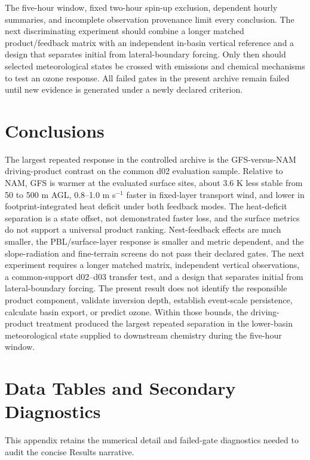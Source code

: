 \documentclass[air,article,submit,moreauthors]{Definitions/mdpi}
\begin{document}
The five-hour window, fixed two-hour spin-up exclusion, dependent hourly summaries, and incomplete observation provenance limit every conclusion.
The next discriminating experiment should combine a longer matched product/feedback matrix with an independent in-basin vertical reference and a design that separates initial from lateral-boundary forcing.
Only then should selected meteorological states be crossed with emissions and chemical mechanisms to test an ozone response.
All failed gates in the present archive remain failed until new evidence is generated under a newly declared criterion.

\section{Conclusions}

The largest repeated response in the controlled archive is the GFS-versus-NAM driving-product contrast on the common d02 evaluation sample.
Relative to NAM, GFS is warmer at the evaluated surface sites, about 3.6 K less stable from 50 to 500 m AGL, 0.8--1.0 m s$^{-1}$ faster in fixed-layer transport wind, and lower in footprint-integrated heat deficit under both feedback modes.
The heat-deficit separation is a state offset, not demonstrated faster loss, and the surface metrics do not support a universal product ranking.
Nest-feedback effects are much smaller, the PBL/surface-layer response is smaller and metric dependent, and the slope-radiation and fine-terrain screens do not pass their declared gates.
The next experiment requires a longer matched matrix, independent vertical observations, a common-support d02--d03 transfer test, and a design that separates initial from lateral-boundary forcing.
The present result does not identify the responsible product component, validate inversion depth, establish event-scale persistence, calculate basin export, or predict ozone.
Within those bounds, the driving-product treatment produced the largest repeated separation in the lower-basin meteorological state supplied to downstream chemistry during the five-hour window.

\clearpage
{}
\appendixstart
\appendix
\section{Data Tables and Secondary Diagnostics}

This appendix retains the numerical detail and failed-gate diagnostics needed to audit the concise Results narrative.
\end{document}
